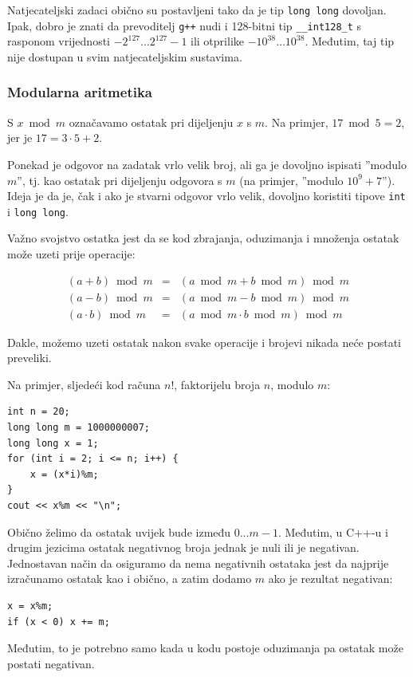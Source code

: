 Natjecateljski zadaci obično su postavljeni tako da je
tip \texttt{long long} dovoljan.
Ipak, dobro je znati da
prevoditelj \texttt{g++} nudi i
128-bitni tip \texttt{\_\_int128\_t}
s rasponom vrijednosti
$-2^{127} \ldots 2^{127}-1$ ili otprilike $-10^{38} \ldots 10^{38}$.
Međutim, taj tip nije dostupan u svim natjecateljskim sustavima.

\subsubsection{Modularna aritmetika}


S $x \bmod m$ označavamo ostatak
pri dijeljenju $x$ s $m$.
Na primjer, $17 \bmod 5 = 2$,
jer je $17 = 3 \cdot 5 + 2$.

Ponekad je odgovor na zadatak
vrlo velik broj, ali ga je dovoljno
ispisati ''modulo $m$'', tj.
kao ostatak pri dijeljenju odgovora s $m$
(na primjer, ''modulo $10^9+7$'').
Ideja je da je, čak i ako je stvarni odgovor
vrlo velik,
dovoljno koristiti tipove
\texttt{int} i \texttt{long long}.

Važno svojstvo ostatka jest da se
kod zbrajanja, oduzimanja i množenja
ostatak može uzeti prije operacije:

\[
\begin{array}{rcr}
(a+b) \bmod m & = & (a \bmod m + b \bmod m) \bmod m \\
(a-b) \bmod m & = & (a \bmod m - b \bmod m) \bmod m \\
(a \cdot b) \bmod m & = & (a \bmod m \cdot b \bmod m) \bmod m
\end{array}
\]

Dakle, možemo uzeti ostatak nakon svake operacije
i brojevi nikada neće postati preveliki.

Na primjer, sljedeći kod računa $n!$,
faktorijelu broja $n$, modulo $m$:
\begin{lstlisting}
int n = 20;
long long m = 1000000007;
long long x = 1;
for (int i = 2; i <= n; i++) {
    x = (x*i)%m;
}
cout << x%m << "\n";
\end{lstlisting}

Obično želimo da ostatak uvijek
bude između $0\ldots m-1$.
Međutim, u C++-u i drugim jezicima
ostatak negativnog broja
jednak je nuli ili je negativan.
Jednostavan način da osiguramo da
nema negativnih ostataka jest da najprije izračunamo
ostatak kao i obično, a zatim dodamo $m$
ako je rezultat negativan:
\begin{lstlisting}
x = x%m;
if (x < 0) x += m;
\end{lstlisting}
Međutim, to je potrebno samo kada u
kodu postoje oduzimanja pa
ostatak može postati negativan.

